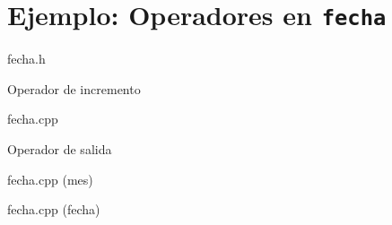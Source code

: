 \section{Ejemplo: Operadores en \texttt{fecha}}

\begin{frame}
\begin{block}{fecha.h}


\end{block}
\end{frame}

\begin{frame}[t,fragile]{Operador de incremento}
\begin{block}{fecha.cpp}

\end{block}
\end{frame}

\begin{frame}[t,fragile]{Operador de salida}
\begin{block}{fecha.cpp (mes)}

\end{block}
\begin{block}{fecha.cpp (fecha)}

\end{block}
\end{frame}
